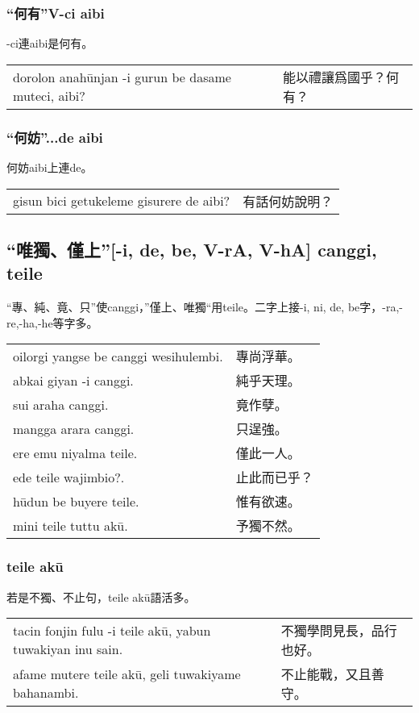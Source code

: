\documentclass{article}
\begin{document}
\subsubsection{“何有”V-ci aibi}
\noindent -ci連aibi是何有。
\begin{center}
    \begin{tabularx}{\textwidth}{XX}
     dorolon anah\={u}njan -i gurun be dasame muteci, aibi? & 能以禮讓爲國乎？何有？
    \end{tabularx}
\end{center}

\subsubsection{“何妨”...de aibi}
\noindent 何妨aibi上連de。
\begin{center}
    \begin{tabularx}{\textwidth}{XX}
     gisun bici getukeleme gisurere de aibi?&有話何妨說明？
    \end{tabularx}
\end{center}

\subsection{“唯獨、僅上”[-i, de, be, V-rA, V-hA] canggi, teile}
\noindent “專、純、竟、只”使canggi，”僅上、唯獨“用teile。二字上接-i, ni, de, be字，-ra,-re,-ha,-he等字多。
\begin{center}
    \begin{tabularx}{\textwidth}{XX}
     oilorgi yangse be canggi wesihulembi. &專尚浮華。\\
     abkai giyan -i canggi. &純乎天理。\\
     sui araha canggi. &竟作孽。\\
     mangga arara canggi. &只逞強。\\
     ere emu niyalma teile. &僅此一人。\\
     ede teile wajimbio?. &止此而已乎？\\
     h\={u}dun be buyere teile. &惟有欲速。\\
     mini teile tuttu ak\={u}. &予獨不然。
    \end{tabularx}
\end{center}

\subsubsection{teile ak\={u}}
\noindent 若是不獨、不止句，teile ak\={u}語活多。
\begin{center}
    \begin{tabularx}{\textwidth}{XX}
     tacin fonjin fulu -i teile ak\={u}, yabun tuwakiyan inu sain. &不獨學問見長，品行也好。\\
     afame mutere teile ak\={u}, geli tuwakiyame bahanambi. &不止能戰，又且善守。
    \end{tabularx}
\end{center}
\end{document}
